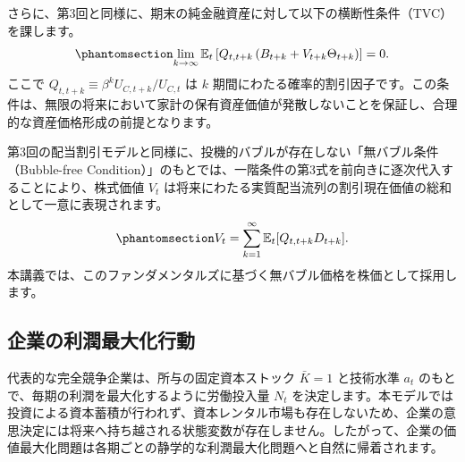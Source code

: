 \documentclass[
  japanese,
  lualatex,
  ja=standard,
  12pt,
  a4paper]{ltjsarticle}
\begin{document}
さらに、第3回と同様に、期末の純金融資産に対して以下の横断性条件（TVC）を課します。
\begin{equation}\protect\phantomsection\label{eq-household-tvc}{
\lim_{k \to \infty} \mathbb{E}_t \left[ Q_{t,t+k} \left( B_{t+k} + V_{t+k} \Theta_{t+k} \right) \right] = 0.
}\end{equation} ここで \(Q_{t,t+k} \equiv \beta^k U_{C,t+k}/U_{C,t}\) は
\(k\)
期間にわたる確率的割引因子です。この条件は、無限の将来において家計の保有資産価値が発散しないことを保証し、合理的な資産価格形成の前提となります。

\begin{tcolorbox}[enhanced jigsaw, arc=.35mm, bottomrule=.15mm, bottomtitle=1mm, breakable, colback=white, colbacktitle=quarto-callout-note-color!10!white, colframe=quarto-callout-note-color-frame, coltitle=black, left=2mm, leftrule=.75mm, opacityback=0, opacitybacktitle=0.6, rightrule=.15mm, title=\textcolor{quarto-callout-note-color}{\faInfo}\hspace{0.5em}{第3回との接続：株式価値}, titlerule=0mm, toprule=.15mm, toptitle=1mm]

第3回の配当割引モデルと同様に、投機的バブルが存在しない「無バブル条件（Bubble-free
Condition）」のもとでは、一階条件の第3式を前向きに逐次代入することにより、株式価値
\(V_t\)
は将来にわたる実質配当流列の割引現在価値の総和として一意に表現されます。
\begin{equation}\protect\phantomsection\label{eq-fundamental-equity-value}{
V_t = \sum_{k=1}^{\infty} \mathbb{E}_t [Q_{t,t+k} D_{t+k}].
}\end{equation}
本講義では、このファンダメンタルズに基づく無バブル価格を株価として採用します。

\end{tcolorbox}

\subsection{企業の利潤最大化行動}\label{ux4f01ux696dux306eux5229ux6f64ux6700ux5927ux5316ux884cux52d5}

代表的な完全競争企業は、所与の固定資本ストック \(\bar{K} = 1\)
と技術水準 \(a_t\) のもとで、毎期の利潤を最大化するように労働投入量
\(N_t\)
を決定します。本モデルでは投資による資本蓄積が行われず、資本レンタル市場も存在しないため、企業の意思決定には将来へ持ち越される状態変数が存在しません。したがって、企業の価値最大化問題は各期ごとの静学的な利潤最大化問題へと自然に帰着されます。
\end{document}
